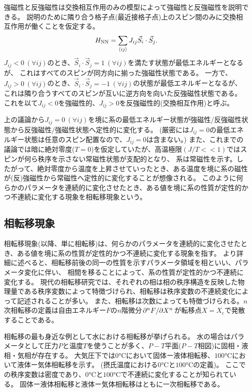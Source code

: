 \documentclass[12pt,titlepage,dvipdfmx]{jarticle}
\begin{document}
強磁性と反強磁性は交換相互作用のみの模型によって強磁性と反強磁性を説明できる。
説明のために隣り合う格子点(最近接格子点)上のスピン間のみに交換相互作用が働くことを仮定する。
\begin{align}
   H_{\mathrm{NN}} = \sum_{\ev{ij}} J_{ij} \vec{S}_i\cdot \vec{S}_j. 
\end{align}
$J_{ij}<0\ (\forall{ij})$のとき、$\vec{S}_i\cdot\vec{S}_j=1\ (\forall{ij})$を満たす状態が最低エネルギーとなるが、
これはすべてのスピンが同方向に揃った強磁性状態である。
一方で、$J_{ij}>0\ (\forall{ij})$のとき、$\vec{S}_i\cdot\vec{S}_j=-1\ (\forall{ij})$の状態が最低エネルギーとなるが、
これは隣り合うすべてのスピンが互いに逆方向を向いた反強磁性状態である。
これを以て$J_{ij}<0$を強磁性的、$J_{ij}>0$を反強磁性的(交換相互作用)と呼ぶ。

上の議論から$J_{ij}=0\ (\forall{ij})$を境に系の最低エネルギー状態が強磁性/反強磁性状態から反強磁性/強磁性状態へ定性的に変化する。
(厳密には$J_{ij}=0$の最低エネルギー状態は任意のスピン配置なので、$J_{ij}=0$は含まない。)
また、これまでの議論では暗に絶対零度($T=0$)を仮定していたが、高温極限$(J/T<<1)$ではスピンが何ら秩序を示さない常磁性状態が支配的となり、
系は常磁性を示す。したがって、絶対零度から温度を上昇させていったとき、ある温度を境に系の磁性が(反)強磁性から常磁性へ定性的に変化することが想像される。
このように何らかのパラメータを連続的に変化させたとき、ある値を境に系の性質が定性的かつ不連続に変化する現象を相転移現象という。


\newpage

\subsection{相転移現象}
相転移現象(以降、単に相転移)は、何らかのパラメータを連続的に変化させたとき、ある値を境に系の性質が定性的かつ不連続に変化する現象を指す。
より詳細に述べると、相転移前後の同一の性質を示すパラメータ領域を相といい、パラメータ変化に伴い、
相間を移ることによって、系の性質が定性的かつ不連続に変化する。
現代の相転移研究では、それぞれの相は相の秩序構造を反映した物理量である秩序変数によって特徴づけられ、相転移は秩序変数の不連続変化によって記述されることが多い。
また、相転移は次数によっても特徴づけられる。$n$次相転移の定義は自由エネルギー$F$の$n$階微分$\pdv*[n]{F}{X}$が転移点$X=X_{\mathrm{c}}$で発散することである。


相転移の最も身近な例として水における相転移が挙げられる。
水の場合はパラメータとして圧力$P$と温度$T$を使うことが多く、$P-T$平面($P-T$相図)に固相・液相・気相が存在する。
大気圧下では$0\si{\degreeCelsius}$において固体ー液体相転移、$100\si{\degreeCelsius}$において液体ー気体相転移を示す。
(摂氏温度における$0\si{\degreeCelsius}$と$100\si{\degreeCelsius}$の定義)。
ここでの秩序変数は密度であり、$0\si{\degreeCelsius}$と$100\si{\degreeCelsius}$で不連続に変化することが知られている。
固体ー液体相転移と液体ー気体相転移はともに一次相転移である。
\end{document}
